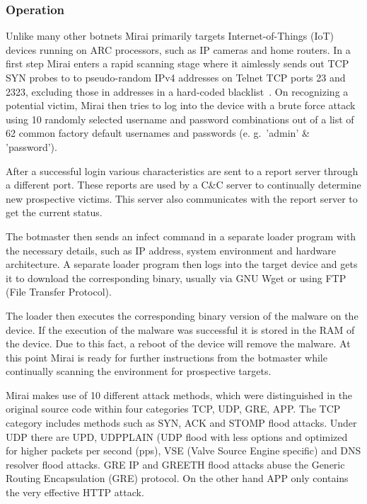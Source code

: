 \subsubsection{Operation}
Unlike many other botnets Mirai primarily targets Internet-of-Things (IoT) devices running on ARC processors, such as IP cameras and home routers.
In a first step Mirai enters a rapid scanning stage where it aimlessly sends out TCP SYN probes to to pseudo-random IPv4 addresses on Telnet TCP ports 23 and 2323, excluding those in addresses in a hard-coded blacklist~\cite{Kolias17}.
On recognizing a potential victim, Mirai then tries to log into the device with a brute force attack using 10 randomly selected username and password combinations out of a list of 62 common factory default usernames and passwords (e. g.\ 'admin' \& 'password').\cite{Antonakakis17}

After a successful login various characteristics are sent to a report server through a different port.
These reports are used by a C\&C server to continually determine new prospective victims.
This server also communicates with the report server to get the current status.\cite{Kolias17}

The botmaster then sends an infect command in a separate loader program with the necessary details, such as IP address, system environment and hardware architecture.
A separate loader program then logs into the target device and gets it to download the corresponding binary, usually via GNU Wget or using FTP (File Transfer Protocol).\cite{Kolias17}

The loader then executes the corresponding binary version of the malware on the device.
If the execution of the malware was successful it is stored in the RAM of the device.
Due to this fact, a reboot of the device will remove the malware.
At this point Mirai is ready for further instructions from the botmaster while continually scanning the environment for prospective targets.\cite{Kolias17}

Mirai makes use of 10 different attack methods, which were distinguished in the original source code within four categories TCP, UDP, GRE, APP. The TCP category includes methods such as SYN, ACK and STOMP flood attacks.
Under UDP there are UPD, UDPPLAIN (UDP flood with less options and optimized for higher packets per second (pps), VSE (Valve Source Engine specific) and DNS resolver flood attacks.
GRE IP and GREETH flood attacks abuse the Generic Routing Encapsulation (GRE) protocol.
On the other hand APP only contains the very effective HTTP attack.\cite{Winward}

